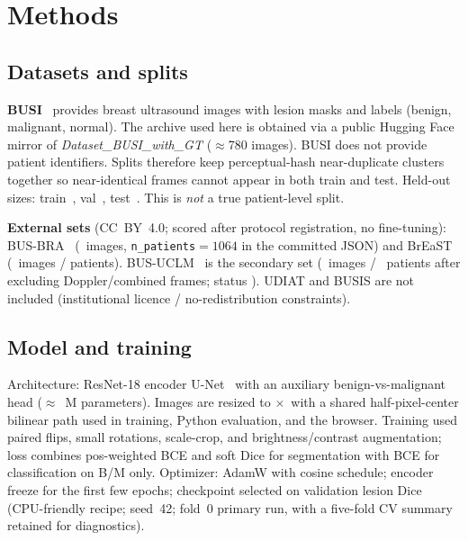 \documentclass[11pt,a4paper]{article}
\begin{document}
\section{Methods}

\subsection{Datasets and splits}

\textbf{BUSI}~\cite{aldhabyani2020busi} provides breast ultrasound images with lesion masks
and labels (benign, malignant, normal). The archive used here is obtained via a public
Hugging Face mirror of \emph{Dataset\_BUSI\_with\_GT} ($\approx$780 images). BUSI does not
provide patient identifiers. Splits therefore keep perceptual-hash near-duplicate clusters
together so near-identical frames cannot appear in both train and test. Held-out sizes:
train~\MetricNTrain, val~\MetricNVal, test~\MetricNTest. This is \emph{not} a true patient-level split.

\textbf{External sets} (CC~BY~4.0; scored after protocol registration, no fine-tuning):
BUS-BRA~\cite{gomezflores2024busbra} (\MetricBusbraN\ images, \texttt{n\_patients}${}=1064$ in the
committed JSON) and BrEaST~\cite{pawlowska2024breast} (\MetricBreastN\ images / patients).
BUS-UCLM~\cite{vallez2025busuclm} is the secondary set (\MetricBusuclmN\ images /
\MetricBusuclmPatients\ patients after excluding Doppler/combined frames; status
\MetricBusuclmStatus). UDIAT and BUSIS are not included (institutional licence / no-redistribution
constraints).

\subsection{Model and training}

Architecture: ResNet-18 encoder U-Net~\cite{ronneberger2015unet} with an auxiliary
benign-vs-malignant head ($\approx$\MetricParamsM\ M parameters). Images are resized to
\MetricImgSize$\times$\MetricImgSize\ with a shared half-pixel-center bilinear path used in training,
Python evaluation, and the browser. Training used paired flips, small rotations, scale-crop,
and brightness/contrast augmentation; loss combines pos-weighted BCE and soft Dice for
segmentation with BCE for classification on B/M only. Optimizer: AdamW with cosine schedule;
encoder freeze for the first few epochs; checkpoint selected on validation lesion Dice
(CPU-friendly recipe; seed~42; fold~0 primary run, with a five-fold CV summary retained for
diagnostics).
\end{document}
